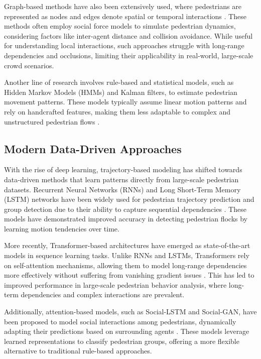 \documentclass{article}
\begin{document}
Graph-based methods have also been extensively used, where pedestrians are represented as nodes and edges denote spatial or temporal interactions \cite{helbing2000social}. These methods often employ social force models to simulate pedestrian dynamics, considering factors like inter-agent distance and collision avoidance. While useful for understanding local interactions, such approaches struggle with long-range dependencies and occlusions, limiting their applicability in real-world, large-scale crowd scenarios.

Another line of research involves rule-based and statistical models, such as Hidden Markov Models (HMMs) and Kalman filters, to estimate pedestrian movement patterns. These models typically assume linear motion patterns and rely on handcrafted features, making them less adaptable to complex and unstructured pedestrian flows \cite{li2008learning}. 

\subsection{Modern Data-Driven Approaches}

With the rise of deep learning, trajectory-based modeling has shifted towards data-driven methods that learn patterns directly from large-scale pedestrian datasets. Recurrent Neural Networks (RNNs) and Long Short-Term Memory (LSTM) networks have been widely used for pedestrian trajectory prediction and group detection due to their ability to capture sequential dependencies \cite{zhang2016deep}. These models have demonstrated improved accuracy in detecting pedestrian flocks by learning motion tendencies over time.

More recently, Transformer-based architectures have emerged as state-of-the-art models in sequence learning tasks. Unlike RNNs and LSTMs, Transformers rely on self-attention mechanisms, allowing them to model long-range dependencies more effectively without suffering from vanishing gradient issues \cite{vaswani2017attention}. This has led to improved performance in large-scale pedestrian behavior analysis, where long-term dependencies and complex interactions are prevalent.

Additionally, attention-based models, such as Social-LSTM and Social-GAN, have been proposed to model social interactions among pedestrians, dynamically adapting their predictions based on surrounding agents \cite{gupta2018social}. These models leverage learned representations to classify pedestrian groups, offering a more flexible alternative to traditional rule-based approaches.
\end{document}
